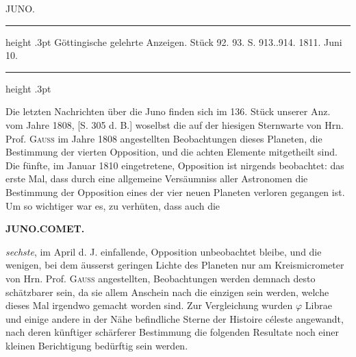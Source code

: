 \par\bigskip
{}
\hypertarget{native-330-lower}{}\label{native-330-lower}
\begin{center}\large JUNO.\end{center}
\begin{center}\parbox{.89\linewidth}{\centering\footnotesize\frenchspacing
\hrule height .3pt\relax\vspace{2.5pt}
Göttingische gelehrte Anzeigen. Stück 92. 93. S. 913..914. 1811. Juni 10.\par
\vspace{2.5pt}\hrule height .3pt\relax
}\end{center}

\par\indent Die letzten Nachrichten über die Juno finden sich im 136. Stück unserer Anz. vom Jahre 1808, [S. 305 d. B.] woselbst die auf der hiesigen Sternwarte von Hrn. Prof. \textsc{Gauss} im Jahre 1808 angestellten Beobachtungen dieses Planeten, die Bestimmung der vierten Opposition, und die achten Elemente mitgetheilt sind. Die fünfte, im Januar 1810 eingetretene, Opposition ist nirgends beobachtet: das erste Mal, dass durch eine allgemeine Versäumniss aller Astronomen die Bestimmung der Opposition eines der vier neuen Planeten verloren gegangen ist. Um so wichtiger war es, zu verhüten, dass auch die\par
{}
\clearpage
\thispagestyle{empty}
\noindent{}%
%
\parbox[t]{\dimexpr\linewidth-24mm\relax}{\centering\footnotesize\bfseries JUNO.\quad COMET.\par}%
\makebox[12mm][r]{}\par\nobreak\medskip
\noindent \emph{sechste}, im April d. J. einfallende,  Opposition unbeobachtet bleibe, und die wenigen, bei dem äusserst geringen Lichte des Planeten nur am Kreismicrometer von Hrn. Prof. \textsc{Gauss} angestellten, Beobachtungen werden demnach desto schätzbarer sein, da sie allem Anschein nach die einzigen sein werden, welche dieses Mal irgendwo gemacht worden sind. Zur Vergleichung wurden $\varphi$ Librae und einige andere in der Nähe befindliche Sterne der Histoire céleste angewandt, nach deren künftiger schärferer Bestimmung die folgenden Resultate noch einer kleinen Berichtigung bedürftig sein werden.
